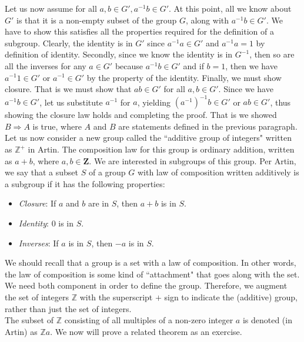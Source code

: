 Let us now assume for all $a,b \in G', a^{-1}b \in G'$.  At this point, all we know about $G'$ is that it is a non-empty subset of the group $G$, along with $a^{-1}b \in G'$.  We have to show this satisfies all the properties required for the definition of a subgroup. Clearly, the identity is in $G'$ since $a^{-1}a \in G'$ and $a^{-1}a=1$ by definition of identity.  Secondly, since we know the identity is in $G^{-1}$, then so are all the inverses for any $a \in G'$ because $a^{-1}b \in G'$ and if $b=1$, then we have $a^{-1}1 \in G'$ or $a^{-1} \in G'$ by the property of the identity.  Finally, we must show closure.  That is we must show that $ab \in G'$ for all $a,b \in G'$.  Since we have $a^{-1} b \in G'$, let us substitute $a^{-1}$ for $a$, yielding $(a^{-1})^{-1}b \in G'$ or $ab \in G'$, thus showing the closure law holds and completing the proof.  That is we showed $B \Longrightarrow A$ is true, where $A$ and $B$ are statements defined in the previous paragraph.\\

Let us now consider a new group called the ``additive group of integers" written as $\mathbb{Z}^{+}$ in Artin.  The composition law for this group is ordinary addition, written as $a+b$, where $a,b \in \mathbf{Z}$.  We are interested in subgroups of this group.  Per Artin, we say that a subset $S$ of a group $G$ with law of composition written additively is a subgroup if it has the following properties:

\begin{itemize}
\item \textit{Closure}: If $a$ and $b$ are in $S$, then $a+b$ is in $S$.
\item \textit{Identity}: $0$ is in $S$.
\item \textit{Inverses}: If $a$ is in $S$, then $-a$ is in $S$.
\end{itemize}

We should recall that a group is a set with a law of composition.  In other words, the law of composition is some kind of ``attachment" that goes along with the set.  We need both component in order to define the group.  Therefore, we augment the set of integers $\mathbb{Z}$ with the superscript $+$ sign to indicate the (additive) group, rather than just the set of integers.\\

The subset of $\mathbb{Z}$ consisting of all multiples of a non-zero integer $a$ is denoted (in Artin) as $\mathbb{Z}a$.  We now will prove a related theorem as an exercise.\\

